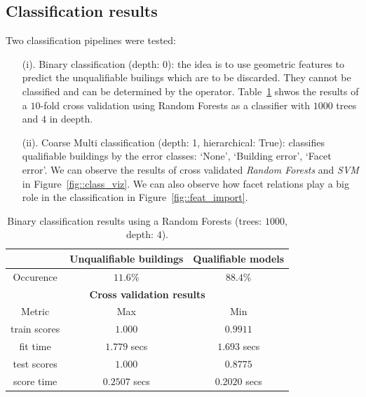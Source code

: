 \documentclass[../main.tex]{subfile}
\begin{document}
    \subsection{Classification results}

    Two classification pipelines were tested:

    \begin{itemize}
        \item[(i).] Binary classification (depth: 0): the idea is to use geometric features to predict the unqualifiable builings which are to be discarded. They cannot be classified and can be determined by the operator. Table~\ref{tab::binary_rf_1000_4} shwos the results of a $10$-fold cross validation using Random Forests as a classifier with $1000$ trees and $4$ in deepth.

        \item[(ii).] Coarse Multi classification (depth: 1, hierarchical: True): classifies qualifiable buildings by the error classes: `None', `Building error', `Facet error'. We can observe the results of cross validated \textit{Random Forests} and \textit{SVM} in Figure~\ref{fig::class_viz}. We can also observe how facet relations play a big role in the classification in Figure~\ref{fig::feat_import}.
    \end{itemize}

    \begin{table}[H]
        \caption{\label{tab::binary_rf_1000_4}Binary classification results using a Random Forests (trees: $1000$, depth: $4$).}
        \begin{tabular}{c c c}
            \toprule
             & \textbf{Unqualifiable buildings} & \textbf{Qualifiable models} \\
            \midrule
            Occurence & $11.6$\% & $88.4$\% \\
            \midrule
            \midrule
            \multicolumn{3}{c}{\textbf{Cross validation results}}\\
            \midrule
            Metric & Max & Min \\
             \midrule
            train scores & $1.000$ & $0.9911$ \\
             \midrule
            fit time & $1.779$ secs & $1.693$ secs \\
             \midrule
            test scores & $1.000$ & $0.8775$\\
             \midrule
            score time & $0.2507$ secs & $0.2020$ secs\\
             \bottomrule
        \end{tabular}
    \end{table}
\end{document}
